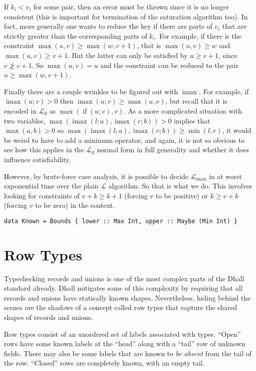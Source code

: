 \documentclass[11pt, twoside, reqno]{book}
\DeclareMathOperator{\imax}{imax}
\DeclareMathOperator{\ifop}{if}
\begin{document}
If $k_i < v_i$ for some pair, then an error must be thrown since it is no longer consistent (this is important for termination of the saturation algorithm too).
In fact, more generally one wants to reduce the key if there are parts of $v_i$ that are strictly greater than the corresponding parts of $k_i$.
For example, if there is the constraint $\max(u, v) \ge \max(w, v+1)$, that is $\max(u, v) \ge w$ and $\max(u, v) \ge v+1$.
But the latter can only be satisfied by $u \ge v+1$, since $v \ngeq v+1$.
So $\max(u, v) = u$ and the constraint can be reduced to the pair $u \ge \max(w, v+1)$.

Finally there are a couple wrinkles to be figured out with $\imax$.
For example, if $\imax(u; v) > 0$ then $\imax(u; v) \ge \max(u, v)$, but recall that it is encoded in $\mathcal{L}_{\ifop}$ as $\max(\ifop(u; v), v)$.
As a more complicated situation with two variables, $\max(\imax(l; a), \imax(r; b)) > 0$ implies that $\max(a, b) > 0$ so $\max(\imax(l; a), \imax(r; b)) \ge \min(l, r)$, it would be weird to have to add a minimum operator, and again, it is not so obvious to see how this applies in the $\mathcal{L}_{\ifop}$ normal form in full generality and whether it does influence satisfiability.

However, by brute-force case analysis, it is possible to decide $\mathcal{L}_{\imax}$ in at worst exponential time over the plain $\mathcal{L}$ algorithm.
So that is what we do.
This involves looking for constraints of $v+k \ge k+1$ (forcing $v$ to be positive) or $k \ge v+k$ (forcing $v$ to be zero) in the context.

\begin{verbatim}
data Known = Bounds { lower :: Max Int, upper :: Maybe (Min Int) }
\end{verbatim}







\chapter{Row Types}
Typechecking records and unions is one of the most complex parts of the Dhall standard already.
Dhall mitigates some of this complexity by requiring that all records and unions have statically known shapes.
Nevertheless, hiding behind the scenes are the shadows of a concept called row types that capture the shared shapes of records and unions.

Row types consist of an unordered set of labels associated with types.
``Open'' rows have some known labels at the ``head'' along with a ``tail'' row of unknown fields.
There may also be some labels that are known to \emph{be absent} from the tail of the row.
``Closed'' rows are completely known, with an empty tail.
\end{document}
